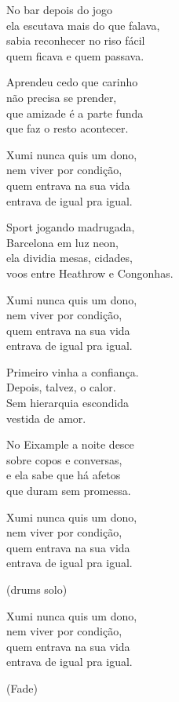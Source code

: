 \begin{lyrics}

No bar depois do jogo\\
ela escutava mais do que falava,\\
sabia reconhecer no riso fácil\\
quem ficava e quem passava.

Aprendeu cedo que carinho\\
não precisa se prender,\\
que amizade é a parte funda\\
que faz o resto acontecer.

Xumi nunca quis um dono,\\
nem viver por condição,\\
quem entrava na sua vida\\
entrava de igual pra igual.

Sport jogando madrugada,\\
Barcelona em luz neon,\\
ela dividia mesas, cidades,\\
voos entre Heathrow e Congonhas.

Xumi nunca quis um dono,\\
nem viver por condição,\\
quem entrava na sua vida\\
entrava de igual pra igual.

Primeiro vinha a confiança.\\
Depois, talvez, o calor.\\
Sem hierarquia escondida\\
vestida de amor.

No Eixample a noite desce\\
sobre copos e conversas,\\
e ela sabe que há afetos\\
que duram sem promessa.

Xumi nunca quis um dono,\\
nem viver por condição,\\
quem entrava na sua vida\\
entrava de igual pra igual.

(drums solo)

Xumi nunca quis um dono,\\
nem viver por condição,\\
quem entrava na sua vida\\
entrava de igual pra igual.

(Fade)

\end{lyrics}

